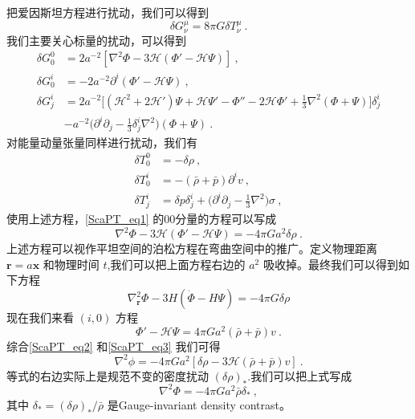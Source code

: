 
\begin{issues}
\issueNeedCite
\issueMissDepend
\end{issues}

把爱因斯坦方程进行扰动，我们可以得到
\begin{equation}\label{ScaPT_eq1}
\delta G^\mu_\nu = 8 \pi G\delta T^\mu_\nu ~.
\end{equation}
我们主要关心标量的扰动，可以得到
\begin{equation}
\begin{aligned}
\delta G^0_0 & = 2 a^{-2} [\nabla^2 \Phi- 3 \mathcal H(\Phi' - \mathcal H \Psi)] ~,  \\
\delta G^i_0 & = - 2 a^{-2} \partial^i(\Phi' - \mathcal H \Psi)~, \\
\delta G^i_j &= 2 a^{-2} \bigg[ (\mathcal H^2 + 2 \mathcal H')\Psi +\mathcal H \Psi' - \Phi'' - 2 \mathcal H \Phi' + \frac{1}{3} \nabla^2 (\Phi+\Psi)  \bigg] \delta^i_j \\
& - a^{-2} \bigg( \partial^i\partial_j - \frac{1}{3} \delta^i_j \nabla^2 \bigg) (\Phi+\Psi) ~.
\end{aligned}
\end{equation}
对能量动量张量同样进行扰动，我们有
\begin{equation}
\begin{aligned}
\delta T^0_0 & = - \delta \rho~, \\
\delta T^i_0 & = - (\bar \rho +\bar p) \partial^i v~, \\
\delta T^i_j & = \delta p \delta^i_j + \bigg( \partial^i\partial_j - \frac{1}{3} \nabla^2 \bigg) \sigma ~,
\end{aligned}
\end{equation}
使用上述方程，\autoref{ScaPT_eq1} 的00分量的方程可以写成
\begin{equation}\label{ScaPT_eq2}
\nabla^2 \Phi - 3 \mathcal H (\Phi' - \mathcal H\Psi) = - 4 \pi G a^2 \delta \rho~. 
\end{equation}
上述方程可以视作平坦空间的泊松方程在弯曲空间中的推广。定义物理距离 $\mathbf r = a \mathbf x$ 和物理时间 $t$,我们可以把上面方程右边的 $a^2$ 吸收掉。最终我们可以得到如下方程
\begin{equation}
\nabla^2_{\mathbf r} \Phi - 3 H (\dot\Phi - H \Psi) = - 4 \pi G \delta \rho
\end{equation}
现在我们来看 $(i,0)$ 方程
\begin{equation}\label{ScaPT_eq3}
\Phi' - \mathcal H \Psi = 4 \pi G a^2 (\bar \rho + \bar p) v ~.
\end{equation}
综合\autoref{ScaPT_eq2} 和\autoref{ScaPT_eq3} 我们可得
\begin{equation}
\nabla^2\phi = - 4 \pi G a^2 [\delta \rho - 3 \mathcal H(\bar\rho+ \bar p) v]~.
\end{equation}
等式的右边实际上是规范不变的密度扰动 $(\delta\rho)_*$.我们可以把上式写成
\begin{equation}
\nabla^2\Phi = - 4 \pi G a^2 \bar \rho \delta_* ~,
\end{equation}
其中 $\delta_* = (\delta \rho)_*/\bar \rho$ 是Gauge-invariant density contrast。

